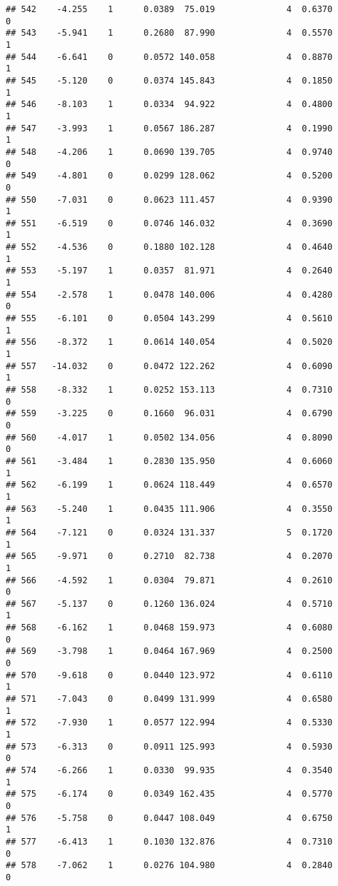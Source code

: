 \documentclass[
]{article}
\begin{document}
\begin{verbatim}
## 542    -4.255    1      0.0389  75.019              4  0.6370      0
## 543    -5.941    1      0.2680  87.990              4  0.5570      1
## 544    -6.641    0      0.0572 140.058              4  0.8870      1
## 545    -5.120    0      0.0374 145.843              4  0.1850      1
## 546    -8.103    1      0.0334  94.922              4  0.4800      1
## 547    -3.993    1      0.0567 186.287              4  0.1990      1
## 548    -4.206    1      0.0690 139.705              4  0.9740      0
## 549    -4.801    0      0.0299 128.062              4  0.5200      0
## 550    -7.031    0      0.0623 111.457              4  0.9390      1
## 551    -6.519    0      0.0746 146.032              4  0.3690      1
## 552    -4.536    0      0.1880 102.128              4  0.4640      1
## 553    -5.197    1      0.0357  81.971              4  0.2640      1
## 554    -2.578    1      0.0478 140.006              4  0.4280      0
## 555    -6.101    0      0.0504 143.299              4  0.5610      1
## 556    -8.372    1      0.0614 140.054              4  0.5020      1
## 557   -14.032    0      0.0472 122.262              4  0.6090      1
## 558    -8.332    1      0.0252 153.113              4  0.7310      0
## 559    -3.225    0      0.1660  96.031              4  0.6790      0
## 560    -4.017    1      0.0502 134.056              4  0.8090      0
## 561    -3.484    1      0.2830 135.950              4  0.6060      1
## 562    -6.199    1      0.0624 118.449              4  0.6570      1
## 563    -5.240    1      0.0435 111.906              4  0.3550      1
## 564    -7.121    0      0.0324 131.337              5  0.1720      1
## 565    -9.971    0      0.2710  82.738              4  0.2070      1
## 566    -4.592    1      0.0304  79.871              4  0.2610      0
## 567    -5.137    0      0.1260 136.024              4  0.5710      1
## 568    -6.162    1      0.0468 159.973              4  0.6080      0
## 569    -3.798    1      0.0464 167.969              4  0.2500      0
## 570    -9.618    0      0.0440 123.972              4  0.6110      1
## 571    -7.043    0      0.0499 131.999              4  0.6580      1
## 572    -7.930    1      0.0577 122.994              4  0.5330      1
## 573    -6.313    0      0.0911 125.993              4  0.5930      0
## 574    -6.266    1      0.0330  99.935              4  0.3540      1
## 575    -6.174    0      0.0349 162.435              4  0.5770      0
## 576    -5.758    0      0.0447 108.049              4  0.6750      1
## 577    -6.413    1      0.1030 132.876              4  0.7310      0
## 578    -7.062    1      0.0276 104.980              4  0.2840      0

\end{verbatim}
\end{document}

